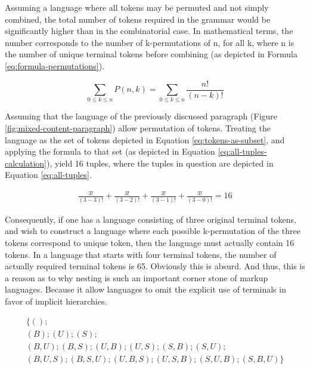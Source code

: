 \documentclass{scrreprt}
\begin{document}
Assuming a language where all tokens may be permuted and not simply combined, the total number of tokens required in the grammar would be significantly higher than in the combinatorial case. In mathematical terms, the number corresponds to the number of k-permutations of n, for all k, where n is the number of unique terminal tokens before combining (as depicted in Formula \ref{eq:formula-permutations}).


\begin{equation}
\sum_{0\leq{k}\leq{n}} P(n,k) = 
\sum_{0\leq{k}\leq{n}} \frac{n!}{(n-k)!}
\label{eq:formula-permutations}
\end{equation}

Assuming that the language of the previously discussed paragraph (Figure \ref{fig:mixed-content-paragraph}) allow permutation of tokens. Treating the language as the set of tokens depicted in Equation \ref{eq:tokens-as-subset}, and applying the formula to that set (as depicted in Equation \ref{eq:all-tuples-calculation}), yield 16 tuples, where the tuples in question are depicted in Equation \ref{eq:all-tuples}.



\begin{equation}
\begin{split}
\frac{3!}{(3-3)!} + \frac{3!}{(3-2)!} + \frac{3!}{(3-1)!} + \frac{3!}{(3-0)!} = 
16
\label{eq:all-tuples-calculation}
\end{split}
\end{equation}



Consequently, if one has a language consisting of three original terminal tokens, and wish to construct a language where each possible k-permutation of the three tokens correspond to unique token, then the language must actually contain 16 tokens. In a language that starts with four terminal tokens, the number of actually required terminal tokens is 65. Obviously this is absurd. And thus, this is a reason as to why nesting is such an important corner stone of markup languages. Because it allow languages to omit the explicit use of terminals in favor of implicit hierarchies.




\begin{equation}
\begin{split}
\{
(); \\
(B);
(U);
(S); \\
(B,U);
(B,S);
(U,B);
(U,S);
(S,B);
(S,U); \\
(B,U,S);
(B,S,U);
(U,B,S);
(U,S,B);
(S,U,B);
(S,B,U)
\}
\label{eq:all-tuples}
\end{split}
\end{equation}
\end{document}
